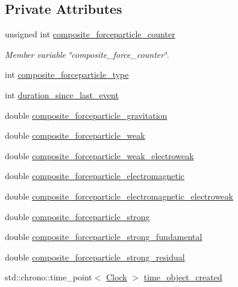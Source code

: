\subsection*{Private Attributes}
\begin{DoxyCompactItemize}
\item 
unsigned int \mbox{\hyperlink{classCompositeForceParticle_a1b502a62a416dc3a971cc6baed3e7e58}{composite\+\_\+forceparticle\+\_\+counter}}
\begin{DoxyCompactList}\small\item\em Member variable \char`\"{}composite\+\_\+force\+\_\+counter\char`\"{}. \end{DoxyCompactList}\item 
int \mbox{\hyperlink{classCompositeForceParticle_a9029889f049c39178317a38669d96c76}{composite\+\_\+forceparticle\+\_\+type}}
\item 
int \mbox{\hyperlink{classCompositeForceParticle_ad3fd0b2258171fa2165745bd856b2e81}{duration\+\_\+since\+\_\+last\+\_\+event}}
\item 
double \mbox{\hyperlink{classCompositeForceParticle_a2319495ec52f23152a1bf251ea721817}{composite\+\_\+forceparticle\+\_\+gravitation}}
\item 
double \mbox{\hyperlink{classCompositeForceParticle_aa669a44bf32fb6cd2215a14be0f41c46}{composite\+\_\+forceparticle\+\_\+weak}}
\item 
double \mbox{\hyperlink{classCompositeForceParticle_a28049d830359c984e904e4c69b1ed709}{composite\+\_\+forceparticle\+\_\+weak\+\_\+electroweak}}
\item 
double \mbox{\hyperlink{classCompositeForceParticle_a63b9441b474337f549352e058ef292f3}{composite\+\_\+forceparticle\+\_\+electromagnetic}}
\item 
double \mbox{\hyperlink{classCompositeForceParticle_a8cdc81ef46a0b4ac35aff48ab530bf34}{composite\+\_\+forceparticle\+\_\+electromagnetic\+\_\+electroweak}}
\item 
double \mbox{\hyperlink{classCompositeForceParticle_a8542f2e98ce1d9aad1796bac04239804}{composite\+\_\+forceparticle\+\_\+strong}}
\item 
double \mbox{\hyperlink{classCompositeForceParticle_a4b69d908c94c3d736a6766d1254893e6}{composite\+\_\+forceparticle\+\_\+strong\+\_\+fundamental}}
\item 
double \mbox{\hyperlink{classCompositeForceParticle_a4db27754a9314d09c4b059016b009f99}{composite\+\_\+forceparticle\+\_\+strong\+\_\+residual}}
\item 
std\+::chrono\+::time\+\_\+point$<$ \mbox{\hyperlink{universe_8h_a0ef8d951d1ca5ab3cfaf7ab4c7a6fd80}{Clock}} $>$ \mbox{\hyperlink{classCompositeForceParticle_a71308d96b2ba9adaebf20715af14c695}{time\+\_\+object\+\_\+created}}

\end{DoxyCompactItemize}
